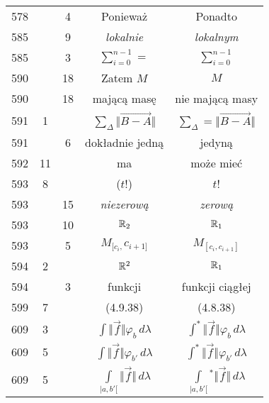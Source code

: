 \documentclass[a4paper,11pt]{article}
\begin{document}
\begin{center}
\begin{tabular}{|c|c|c|c|c|}
    578 & &  4 & Ponieważ & Ponadto \\
    585 & &  9 & \textit{lokalnie} & \textit{lokalnym} \\
    585 & &  3 & $\sum\limits_{ i = 0 }^{ n - 1 } =$
           & $\sum\limits_{ i = 0 }^{ n - 1 }$ \\
    590 & & 18 & Zatem $M$ & $M$ \\
    590 & & 18 & mającą masę & nie mającą masy \\
    591 &  1 & & $\sum\limits_{ \Delta } \Vert \overrightarrow{ B - A } \Vert$
           & $\sum\limits_{ \Delta } = \Vert \overrightarrow{ B - A } \Vert$ \\
    591 & &  6 & dokładnie jedną & jedyną \\
    592 & 11 & & ma & może mieć \\
    593 &  8 & & ($ t $!) & $ t $! \\
    593 & & 15 & \textit{niezerową} & \textit{zerową} \\
    593 & & 10 & $\mathbb{R}_{ 2 }$ & $\mathbb{R}_{ 1 }$ \\
    593 & &  5 & $M_{ [ c_{ i }, } c_{ i + 1 ] }$
           & $M_{ [ c_{ i }, c_{ i + 1 } ] }$ \\
    594 &  2 & & $\mathbb{R}^{ 2 }$ & $\mathbb{R}_{ 1 }$ \\
    594 & &  3 & funkcji & funkcji ciągłej \\
    599 &  7 & & (4.9.38) & (4.8.38) \\
    609 &  3 & & $\int \Vert \vec{ f } \Vert \varphi_{ b } \, d\lambda$
           & $\int^{ * } \Vert \vec{ f } \Vert \varphi_{ b } \, d\lambda$ \\
    609 &  5 & & $\int \Vert \vec{ f } \Vert \varphi_{ b' } \, d\lambda$
           & $\int^{ * } \Vert \vec{ f } \Vert \varphi_{ b' } \, d\lambda$ \\
    609 &  5 & & $\int\limits_{ | a, b' [ } \Vert \vec{ f } \Vert \, d\lambda$
           & $\int\limits_{ | a, b' [ }{^{ * }} \Vert \vec{ f } \Vert \, d\lambda$ \\
    \hline
  \end{tabular}

\end{center}
\end{document}
